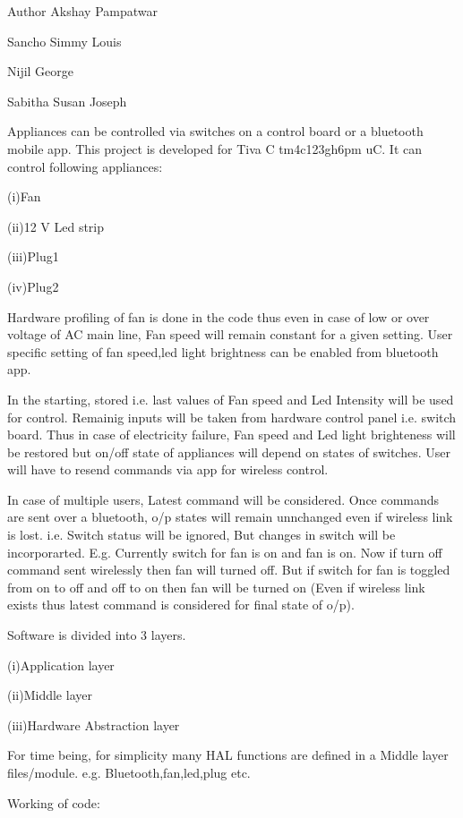 \begin{DoxyAuthor}{Author}
Akshay Pampatwar 

Sancho Simmy Louis 

Nijil George 

Sabitha Susan Joseph
\end{DoxyAuthor}
Appliances can be controlled via switches on a control board or a bluetooth mobile app. This project is developed for Tiva C tm4c123gh6pm uC. It can control following appliances\+:

(i)Fan

(ii)12 V Led strip

(iii)Plug1

(iv)Plug2

Hardware profiling of fan is done in the code thus even in case of low or over voltage of AC main line, Fan speed will remain constant for a given setting. User specific setting of fan speed,led light brightness can be enabled from bluetooth app.

In the starting, stored i.\+e. last values of Fan speed and Led Intensity will be used for control. Remainig inputs will be taken from hardware control panel i.\+e. switch board. Thus in case of electricity failure, Fan speed and Led light brighteness will be restored but on/off state of appliances will depend on states of switches. User will have to resend commands via app for wireless control.

In case of multiple users, Latest command will be considered. Once commands are sent over a bluetooth, o/p states will remain unnchanged even if wireless link is lost. i.\+e. Switch status will be ignored, But changes in switch will be incorporarted. E.\+g. Currently switch for fan is on and fan is on. Now if turn off command sent wirelessly then fan will turned off. But if switch for fan is toggled from on to off and off to on then fan will be turned on (Even if wireless link exists thus latest command is considered for final state of o/p). \begin{DoxyVerb}Software is divided into 3 layers.
\end{DoxyVerb}


(i)Application layer

(ii)Middle layer

(iii)Hardware Abstraction layer

For time being, for simplicity many H\+AL functions are defined in a Middle layer files/module. e.\+g. Bluetooth,fan,led,plug etc. \begin{DoxyVerb}Working of code: 
\end{DoxyVerb}


